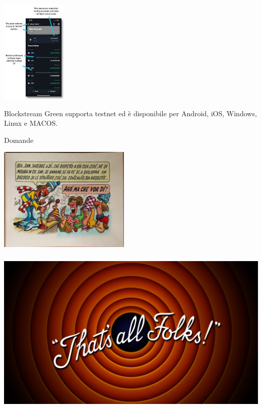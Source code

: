 \documentclass[aspectratio=169]{beamer}
\begin{document}
\begin{frame}{}
    \begin{center}
        \includegraphics[height=5cm]{testnet.jpeg}
    \end{center}
    Blockstream Green supporta testnet ed è disponibile per Android, iOS, Windows, Linux e MACOS.
\end{frame}




\begin{frame}{Domande} 
    \begin{center}
        \includegraphics[height=5cm]{domande.jpg}
    \end{center}
\end{frame}

\begin{frame}[plain]
    \begin{center}
        \includegraphics[height=8cm]{fine.jpg}
    \end{center}
\end{frame}
\end{document}

